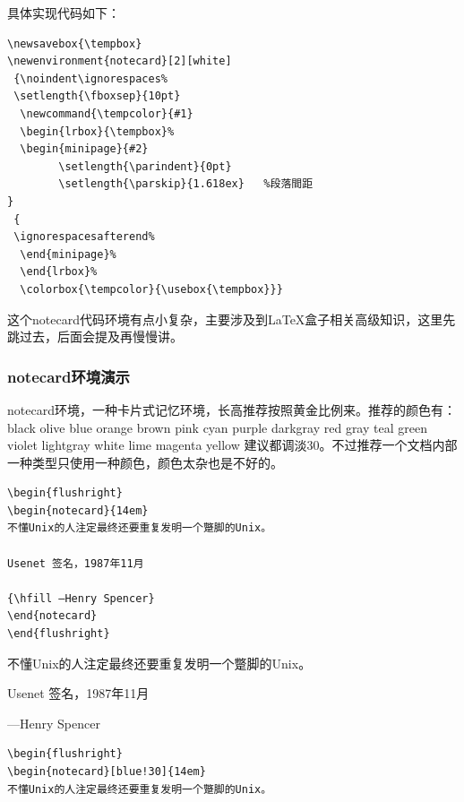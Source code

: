 \documentclass[12pt,oneside]{book}
\begin{document}
\begin{common-format}
具体实现代码如下：
\begin{Verbatim}
\newsavebox{\tempbox}
\newenvironment{notecard}[2][white]
 {\noindent\ignorespaces%
 \setlength{\fboxsep}{10pt}
  \newcommand{\tempcolor}{#1}
  \begin{lrbox}{\tempbox}%
  \begin{minipage}{#2}
        \setlength{\parindent}{0pt}
        \setlength{\parskip}{1.618ex}   %段落間距
}
 {
 \ignorespacesafterend%
  \end{minipage}%
  \end{lrbox}%
  \colorbox{\tempcolor}{\usebox{\tempbox}}}
\end{Verbatim}

这个notecard代码环境有点小复杂，主要涉及到\LaTeX 盒子相关高级知识，这里先跳过去，后面会提及再慢慢讲。


\subsubsection{notecard环境演示}
notecard环境，一种卡片式记忆环境，长高推荐按照黄金比例来。推荐的颜色有：black olive blue orange brown pink cyan purple darkgray red gray teal green violet lightgray white lime magenta yellow 建议都调淡30。不过推荐一个文档内部一种类型只使用一种颜色，颜色太杂也是不好的。

\begin{Verbatim}
\begin{flushright}
\begin{notecard}{14em}
不懂Unix的人注定最终还要重复发明一个蹩脚的Unix。

Usenet 签名，1987年11月

{\hfill —Henry Spencer}
\end{notecard}
\end{flushright}
\end{Verbatim}

\begin{flushright}
\begin{notecard}{14em}
不懂Unix的人注定最终还要重复发明一个蹩脚的Unix。

Usenet 签名，1987年11月

{\hfill —Henry Spencer}
\end{notecard}
\end{flushright}


\begin{Verbatim}
\begin{flushright}
\begin{notecard}[blue!30]{14em}
不懂Unix的人注定最终还要重复发明一个蹩脚的Unix。


\end{Verbatim}
\end{common-format}
\end{document}
